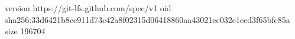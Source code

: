 version https://git-lfs.github.com/spec/v1
oid sha256:33d6421b8ce911d73c42a8f02315d06418860aa43021ec032e1ecd3f65bfe85a
size 196704
